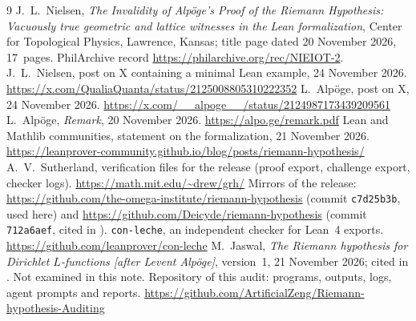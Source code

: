 \begin{thebibliography}{9}
 J.~L.~Nielsen, \emph{The Invalidity of Alpöge's Proof of the Riemann Hypothesis: Vacuously true geometric and lattice witnesses in the Lean formalization},
Center for Topological Physics, Lawrence, Kansas; title page dated 20 November 2026, 17~pages. PhilArchive record \url{https://philarchive.org/rec/NIEIOT-2}.
 J.~L.~Nielsen, post on X containing a minimal Lean example, 24 November 2026. \url{https://x.com/QualiaQuanta/status/2125008805310222352}
 L.~Alpöge, post on X, 24 November 2026. \url{https://x.com/__alpoge__/status/2124987173439209561}
 L.~Alpöge, \emph{Remark}, 20 November 2026. \url{https://alpo.ge/remark.pdf}
 Lean and Mathlib communities, statement on the formalization, 21 November 2026. \url{https://leanprover-community.github.io/blog/posts/riemann-hypothesis/}
 A.~V.~Sutherland, verification files for the release (proof export, challenge export, checker logs). \url{https://math.mit.edu/~drew/grh/}
 Mirrors of the release: \url{https://github.com/the-omega-institute/riemann-hypothesis} (commit \texttt{c7d25b3b}, used here) and \url{https://github.com/Deicyde/riemann-hypothesis} (commit \texttt{712a6aef}, cited in \N).
 \texttt{con-leche}, an independent checker for Lean~4 exports. \url{https://github.com/leanprover/con-leche}
 M.~Jaswal, \emph{The Riemann hypothesis for Dirichlet $L$-functions [after Levent Alpöge]}, version~1, 21 November 2026; cited in \N. Not examined in this note.
 Repository of this audit: programs, outputs, logs, agent prompts and reports. \url{https://github.com/ArtificialZeng/Riemann-hypothesis-Auditing}
\end{thebibliography}
